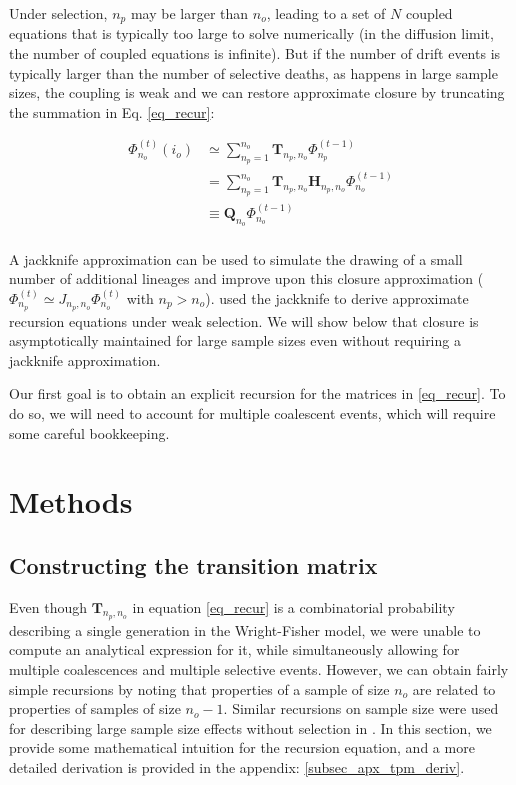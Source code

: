 \documentclass[review]{elsarticle}
\newcommand{\afs}[2]{\Phi_{#1}^{(#2)}}
\begin{document}
Under selection, $n_{p}$ may be larger than $n_o$, leading to a set of $N$ coupled equations that is
typically too large to solve numerically (in the diffusion limit, the number of coupled equations is
infinite). But if the number of drift events is typically larger than the number of selective
deaths, as happens in large sample sizes, the coupling is weak and we can restore approximate
closure by truncating the summation in Eq. \ref{eq_recur}:

\begin{equation}
\begin{split}
  \afs{n_o}{t}(i_o)
  &\simeq \sum_{n_p=1}^{n_{o}} \mathbf{T}_{n_p,n_o}                      \afs{n_p}{t-1}\\
  &=      \sum_{n_p=1}^{n_{o}} \mathbf{T}_{n_p,n_o} \mathbf{H}_{n_p,n_o} \afs{n_o}{t-1}\\
  &\equiv \mathbf{Q}_{n_o}                                               \afs{n_o}{t-1}\\
\end{split}
\label{eq_truncated}
\end{equation}

A jackknife approximation \citep{Gravel2016} can be used to simulate the drawing of a small number
of additional lineages and improve upon this closure approximation
($\afs{n_p}{t} \simeq J_{n_p,n_o} \afs{n_o}{t}$ with $n_p>n_o$). \cite{JouganousEtAl2017} used the
jackknife to derive approximate recursion equations under weak selection. We will show below that
closure is asymptotically maintained for large sample sizes even without requiring a jackknife
approximation.

Our first goal is to obtain an explicit recursion for the matrices in \eqref{eq_recur}. To do so, we
will need to account for multiple coalescent events, which will require some careful bookkeeping.

\section{Methods}
\label{sec_methods}

\subsection{Constructing the transition matrix}
\label{subsec_trans_mat}

Even though $\mathbf{T}_{n_p,n_o}$ in equation \ref{eq_recur} is a combinatorial probability
describing a single generation in the Wright-Fisher model, we were unable to compute an analytical
expression for it, while simultaneously allowing for multiple coalescences and multiple selective events. 
However,
we can obtain fairly simple recursions by noting that properties of a sample of size $n_o$ are
related to properties of samples of size $n_o-1.$ Similar recursions on sample size were used for
describing large sample size effects without selection in \citep{BhaskarEtAl2014}. In this section,
we provide some mathematical intuition for the recursion equation, and a more detailed derivation is provided in
the appendix: \ref{subsec_apx_tpm_deriv}.
\end{document}
